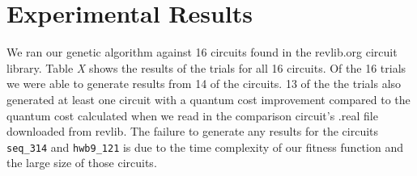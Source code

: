 \section{Experimental Results}

We ran our genetic algorithm against 16 circuits found in the revlib.org circuit library. Table \emph{X} shows the results of the trials 
for all 16 circuits. Of the 16 trials we were able to generate results from 14 of the circuits. 13 of the the trials also generated 
at least one circuit with a quantum cost improvement compared to the quantum cost calculated when we read in the comparison 
circuit's .real file downloaded from revlib. The failure to generate any results for the circuits \verb!seq_314! and
 \verb!hwb9_121! is due to the time complexity of our fitness function and the large size of those circuits. 

